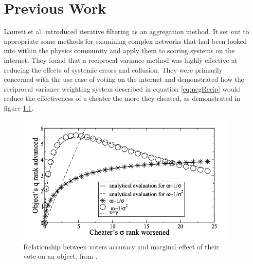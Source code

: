 \chapter{Previous Work}\label{chap:litReview}

Laureti et al. \cite{laureti2006information} introduced iterative filtering as an aggregation method. It set out to appropriate some methods for examining complex networks that had been looked into within the physics community and apply them to scoring systems on the internet. They found that a reciprocal variance method was highly effective at reducing the effects of systemic errors and collusion. They were primarily concerned with the use case of voting on the internet and demonstrated how the reciprocal variance weighting system described in equation \ref{eq:negRecip} would reduce the effectiveness of a cheater the more they cheated, as demonstrated in figure \ref{fig:recipCheating}.

\begin{figure}[H]
    \centering
    \includegraphics{Figures/recipCheating.png}
    \caption[Relationship between voters accuracy and marginal effect of their vote on an object]{Relationship between voters accuracy and marginal effect of their vote on an object, from \textcite{laureti2006information}.}
    \label{fig:recipCheating}
\end{figure}

